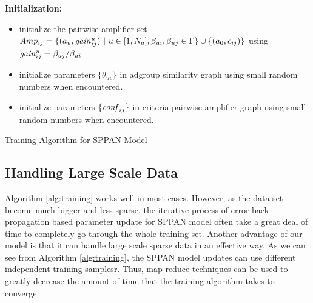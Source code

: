 \begin{algorithm}
  \textbf{Initialization:}\\
  \begin{itemize}
  \item initialize the pairwise amplifier set
    $Amp_{ij}=\{(a_u,\mathit{gain}^{u}_{ij})~|~u\in
    [1,N_a],\beta_{ui},\beta_{uj}\in \Gamma\} \cup \{(a_0,c_{ij})\}$
    using $\mathit{gain}^{u}_{ij}=\beta_{uj}/\beta_{ui}$
  \item initialize parameters $\{\theta_{uv}\}$ in adgroup similarity
    graph using small random numbers when encountered.
  \item initialize parameters $\{\mathit{conf}_{ij}\}$ in criteria pairwise
    amplifier graph using small random numbers when encountered.
  \end{itemize}
  \caption{Training Algorithm for SPPAN Model}
  \label{alg:training}
\end{algorithm}

\subsection{Handling Large Scale  Data}
Algorithm \ref{alg:training} works well in most cases. However, as the
data set become much bigger and less sparse, the iterative process of
error back propagation based parameter update for SPPAN model often
take a great deal of time to completely go through the whole training
set.  Another advantage of our model is that it can handle large scale
sparse data in an effective way. As we can see from Algorithm
\ref{alg:training}, the SPPAN model updates can use different
independent training samplesr. Thus, map-reduce techniques can be used
to greatly decrease the amount of time that the training algorithm
takes to converge.


